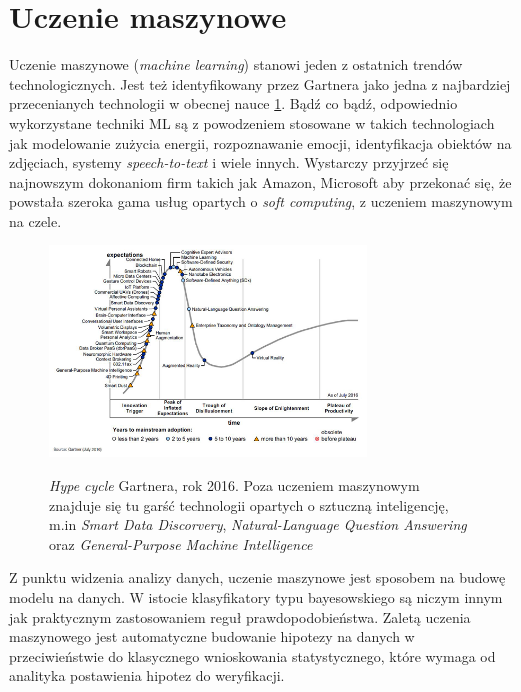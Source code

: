 \documentclass[12pt,a4paper,oneside]{report} %
\begin{document}
\section{Uczenie maszynowe}

Uczenie maszynowe (\emph{machine learning}) stanowi jeden z ostatnich trendów technologicznych. Jest też identyfikowany przez Gartnera jako jedna z najbardziej przecenianych technologii w obecnej nauce \ref{gartner}. Bądź co bądź, odpowiednio wykorzystane techniki ML są z powodzeniem stosowane w takich technologiach jak modelowanie zużycia energii, rozpoznawanie emocji, identyfikacja obiektów na zdjęciach, systemy \emph{speech-to-text} i wiele innych. Wystarczy przyjrzeć się najnowszym dokonaniom firm takich jak Amazon, Microsoft aby przekonać się, że powstała szeroka gama usług opartych o \emph{soft computing}, z uczeniem maszynowym na czele. \par

\begin{figure}
\centering
\includegraphics[width=0.75\textwidth]{gartner.png}
\label{gartner}
\caption[\emph{Hype cycle} Gartnera, rok 2016.]{\emph{Hype cycle} Gartnera, rok 2016. Poza uczeniem maszynowym znajduje się tu garść technologii opartych o sztuczną inteligencję, m.in \emph{Smart Data Discorvery}, \emph{Natural-Language Question Answering} oraz \emph{General-Purpose Machine Intelligence}}
\end{figure}

Z punktu widzenia analizy danych, uczenie maszynowe jest sposobem na budowę modelu na danych. W istocie klasyfikatory typu bayesowskiego są niczym innym jak praktycznym zastosowaniem reguł prawdopodobieństwa. Zaletą uczenia maszynowego jest automatyczne budowanie hipotezy na danych w przeciwieństwie do klasycznego wnioskowania statystycznego, które wymaga od analityka postawienia hipotez do weryfikacji. \par
\end{document}
